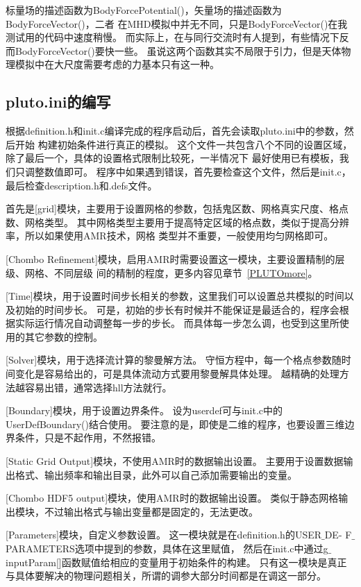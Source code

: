 标量场的描述函数为BodyForcePotential()，矢量场的描述函数为BodyForceVector()，二者
在MHD模拟中并无不同，只是BodyForceVector()在我测试用的代码中速度稍慢。
而实际上，在与同行交流时有人提到，有些情况下反而BodyForceVector()要快一些。
虽说这两个函数其实不局限于引力，但是天体物理模拟中在大尺度需要考虑的力基本只有这一种。

\subsection{pluto.ini的编写}
根据definition.h和init.c编译完成的程序启动后，首先会读取pluto.ini中的参数，然后开始
构建初始条件进行真正的模拟。
这个文件一共包含八个不同的设置区域，除了最后一个，具体的设置格式限制比较死，一半情况下
最好使用已有模板，我们只调整数值即可。
程序中如果遇到错误，首先要检查这个文件，然后是init.c，最后检查description.h和.defs文件。

首先是[grid]模块，主要用于设置网格的参数，包括鬼区数、网格真实尺度、格点数、网格类型。
其中网格类型主要用于提高特定区域的格点数，类似于提高分辨率，所以如果使用AMR技术，网格
类型并不重要，一般使用均匀网格即可。

[Chombo Refinement]模块，启用AMR时需要设置这一模块，主要设置精制的层级、网格、不同层级
间的精制的程度，更多内容见章节~\ref{PLUTOmore}。

[Time]模块，用于设置时间步长相关的参数，这里我们可以设置总共模拟的时间以及初始的时间步长。
可是，初始的步长有时候并不能保证是最适合的，程序会根据实际运行情况自动调整每一步的步长。
而具体每一步怎么调，也受到这里所使用的其它参数的控制。

[Solver]模块，用于选择流计算的黎曼解方法。
守恒方程中，每一个格点参数随时间变化是容易给出的，可是具体流动方式要用黎曼解具体处理。
越精确的处理方法越容易出错，通常选择hll方法就行。

[Boundary]模块，用于设置边界条件。
设为userdef可与init.c中的UserDefBoundary()结合使用。
要注意的是，即使是二维的程序，也要设置三维边界条件，只是不起作用，不然报错。

[Static Grid Output]模块，不使用AMR时的数据输出设置。
主要用于设置数据输出格式、输出频率和输出目录，此外可以自己添加需要输出的变量。

[Chombo HDF5 output]模块，使用AMR时的数据输出设置。
类似于静态网格输出模块，不过输出格式与输出变量都是固定的，无法更改。

[Parameters]模块，自定义参数设置。
这一模块就是在definition.h的USER$\_$DE- F$\_$PARAMETERS选项中提到的参数，具体在这里赋值，
然后在init.c中通过g$\_$inputParam[]函数赋值给相应的变量用于初始条件的构建。
只有这一模块是真正与具体要解决的物理问题相关，所谓的调参大部分时间都是在调这一部分。

